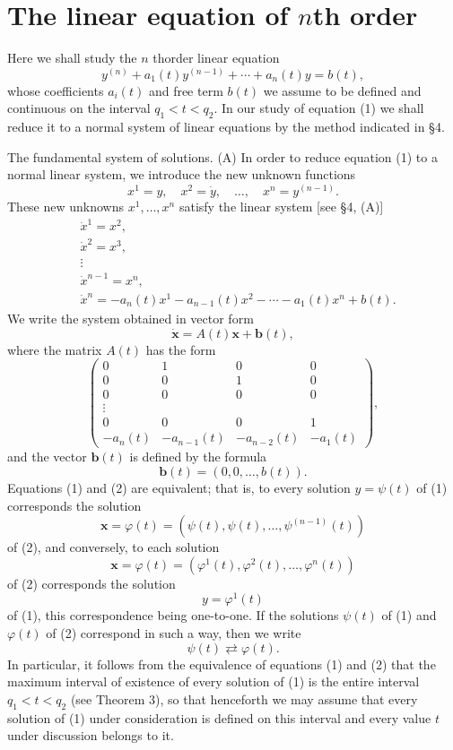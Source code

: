 \documentclass[10pt,a5paper]{book}
\theoremstyle{plain}
\theoremstyle{definition}
\theoremstyle{remark}
\begin{document}
\section{The linear equation of $n$th order}
Here we shall study the $n$ thorder linear equation
\begin{equation*}
y^{(n)}+a_{1}(t) y^{(n-1)}+\cdots+a_{n}(t) y=b(t), \tag{1}
\end{equation*}
whose coefficients $a_{i}(t)$ and free term $b(t)$ we assume to be defined and continuous on the interval $q_{1}<t<q_{2}$. In our study of equation (1) we shall reduce it to a normal system of linear equations by the method indicated in §4.

The fundamental system of solutions. (A) In order to reduce equation (1) to a normal linear system, we introduce the new unknown functions
\[
x^{1}=y, \quad x^{2}=\dot{y}, \quad \ldots, \quad x^{n}=y^{(n-1)} .
\]
These new unknowns $x^{1}, \ldots, x^{n}$ satisfy the linear system [see §4, (A)]
\[
\begin{aligned}
& \dot{x}^{1}=x^{2}, \\
& \dot{x}^{2}=x^{3}, \\
& \vdots \\
& \dot{x}^{n-1}=x^{n}, \\
& \dot{x}^{n}=-a_{n}(t) x^{1}-a_{n-1}(t) x^{2}-\cdots-a_{1}(t) x^{n}+b(t) .
\end{aligned}
\]
We write the system obtained in vector form
\begin{equation*}
\dot{\mathbf{x}}=A(t) \mathbf{x}+\mathbf{b}(t), \tag{2}
\end{equation*}
where the matrix $A(t)$ has the form
\[
\left(\begin{array}{cccc}
0 & 1 & 0 & 0  \tag{3}\\
0 & 0 & 1 & 0 \\
0 & 0 & 0 & 0 \\
\vdots & & & \\
0 & 0 & 0 & 1 \\
-a_{n}(t) & -a_{n-1}(t) & -a_{n-2}(t) & -a_{1}(t)
\end{array}\right),
\]
and the vector $\mathbf{b}(t)$ is defined by the formula
\[
\mathbf{b}(t)=(0,0, \ldots, b(t)) .
\]
Equations (1) and (2) are equivalent; that is, to every solution $y=\psi(t)$ of (1) corresponds the solution
\[
\mathbf{x}=\varphi(t)=\left(\psi(t), \psi(t), \ldots, \psi^{(n-1)}(t)\right)
\]
of (2), and conversely, to each solution
\[
\mathbf{x}=\varphi(t)=\left(\varphi^{1}(t), \varphi^{2}(t), \ldots, \varphi^{n}(t)\right)
\]
of (2) corresponds the solution
\[
y=\varphi^{1}(t)
\]
of (1), this correspondence being one-to-one. If the solutions $\psi(t)$ of (1) and $\varphi(t)$ of (2) correspond in such a way, then we write
\[
\psi(t) \rightleftarrows \varphi(t) .
\]
In particular, it follows from the equivalence of equations (1) and (2) that the maximum interval of existence of every solution of (1) is the entire interval $q_{1}<t<q_{2}$ (see Theorem 3), so that henceforth we may assume that every solution of (1) under consideration is defined on this interval and every value $t$ under discussion belongs to it.
\end{document}
